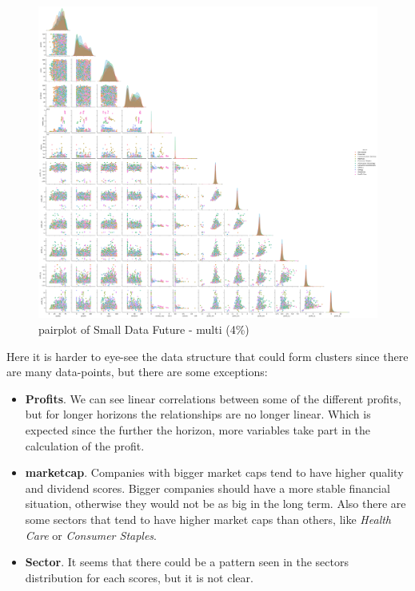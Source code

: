 \documentclass[11pt,english,a4paper,hidelinks]{book}
\begin{document}
\begin{figure}[H]
    \centering
    \includegraphics[width=1\textwidth]{images/code/descriptive analysis/correlations/Small Data future - Multi - pairplot.png}
    \caption{\acrshort{pairplot} of Small Data Future - \acrshort{multi} (4\%)}
    \label{fig:pairplot_small_data_future_multi}
\end{figure}

\noindent Here it is harder to eye-see the data structure that could form clusters since there are many data-points, but there are some exceptions:
\begin{itemize}
    \item \textbf{Profits}. We can see linear correlations between some of the different profits, but for longer horizons the relationships are no longer linear. Which is expected since the further the horizon, more variables take part in the calculation of the profit.
    \item \textbf{\acrshort{marketcap}}. Companies with bigger market caps tend to have higher quality and dividend scores. Bigger companies should have a more stable financial situation, otherwise they would not be as big in the long term. Also there are some sectors that tend to have higher market caps than others, like \textit{Health Care} or \textit{Consumer Staples}.
    \item \textbf{Sector}. It seems that there could be a pattern seen in the sectors distribution for each scores, but it is not clear.
\end{itemize}
\end{document}

